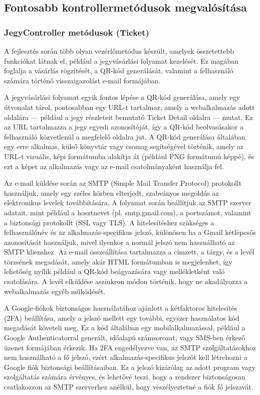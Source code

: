\subsection{Fontosabb kontrollermetódusok megvalósítása}
\subsubsection{JegyController metódusok (Ticket)}
A fejlesztés során több olyan vezérlőmetódus készült, amelyek összetettebb funkciókat látnak el, például a jegyvásárlási folyamat kezelését. Ez magában foglalja a vásárlás rögzítését, a QR-kód generálását, valamint a felhasználó számára történő visszaigazolást e-mail formájában.

A jegyvásárlási folyamat egyik fontos lépése a QR-kód generálása, amely egy útvonalat tárol, pontosabban egy URL-t tartalmaz, amely a webalkalmazás adott oldalára — például a jegy részleteit bemutató Ticket Detail oldalra — mutat. Ez az URL tartalmazza a jegy egyedi azonosítóját, így a QR-kód beolvasásakor a felhasználó közvetlenül a megfelelő oldalra jut. A QR-kód generálása általában egy erre alkalmas, külső könyvtár vagy csomag segítségével történik, amely az URL-t vizuális, képi formátumba alakítja át (például PNG formátumú képpé), és ezt a képet az alkalmazás vagy az e-mail csatolmányaként használja fel.

Az e-mail küldése során az SMTP (Simple Mail Transfer Protocol) protokollt használjuk, amely egy széles körben elterjedt, szabványos megoldás az elektronikus levelek továbbítására. A folyamat során beállítjuk az SMTP szerver adatait, mint például a hosztnevet (pl. smtp.gmail.com), a portszámot, valamint a biztonsági protokollt (SSL vagy TLS). A hitelesítéshez szükséges a felhasználónév és az alkalmazás-specifikus jelszó, különösen ha a Gmail kétlépcsős azonosítását használjuk, mivel ilyenkor a normál jelszó nem használható az SMTP klienshez. Az e-mail összeállítása tartalmazza a címzett, a tárgy, és a levél törzsének megadását, amely akár HTML formátumban is megjelenhet, így lehetőség nyílik például a QR-kód beágyazására vagy mellékletként való csatolására. A levél elküldése aszinkron módon történik, hogy ne akadályozza a webalkalmazás egyéb működését.

A Google-fiókok biztonságos használatához ajánlott a kétfaktoros hitelesítés (2FA) beállítása, amely a jelszó mellett egy további, egyszer használatos kód megadását követeli meg. Ez a kód általában egy mobilalkalmazással, például a Google Authenticatorral generált, időalapú számsorozat, vagy SMS-ben érkező üzenet formájában érkezik. Ha 2FA engedélyezve van, az SMTP szolgáltatásokhoz nem használható a fő jelszó, ezért alkalmazás-specifikus jelszót kell létrehozni a Google fiók biztonsági beállításaiban. Ez a jelszó kizárólag az adott program vagy szolgáltatás számára érvényes, és lehetővé teszi, hogy a rendszer biztonságosan csatlakozzon az SMTP szerverhez anélkül, hogy veszélyeztetné a fiók fő jelszavát.

